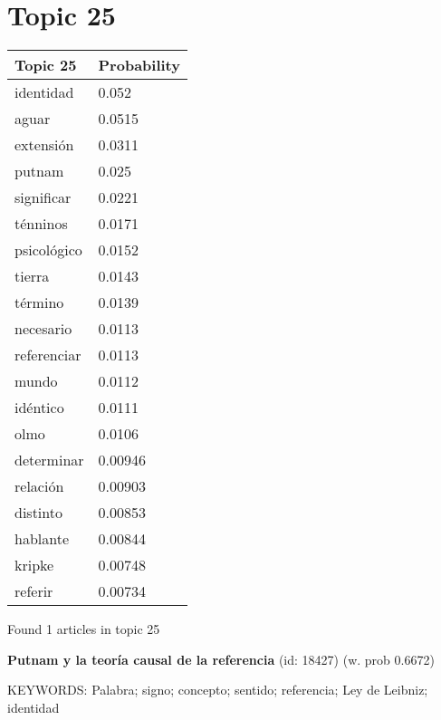 \documentclass{article}
\begin{document}
\section*{Topic 25}\vfill
\begin{tabular}{ll}
\toprule
    Topic 25 & Probability \\
\midrule
   identidad &       0.052 \\
       aguar &      0.0515 \\
   extensión &      0.0311 \\
      putnam &       0.025 \\
  significar &      0.0221 \\
    ténninos &      0.0171 \\
 psicológico &      0.0152 \\
      tierra &      0.0143 \\
     término &      0.0139 \\
   necesario &      0.0113 \\
 referenciar &      0.0113 \\
       mundo &      0.0112 \\
    idéntico &      0.0111 \\
        olmo &      0.0106 \\
  determinar &     0.00946 \\
    relación &     0.00903 \\
    distinto &     0.00853 \\
    hablante &     0.00844 \\
      kripke &     0.00748 \\
     referir &     0.00734 \\
\bottomrule
\end{tabular}

\vfill
Found 1 articles in topic 25
\vfill

\textbf{Putnam y la teoría causal de la referencia} (id: 18427)
 (w. prob 0.6672)


KEYWORDS:
Palabra; signo; concepto; sentido; referencia; Ley de Leibniz; identidad

\vfill
\newpage


\centering
\thispagestyle{empty}
\end{document}
